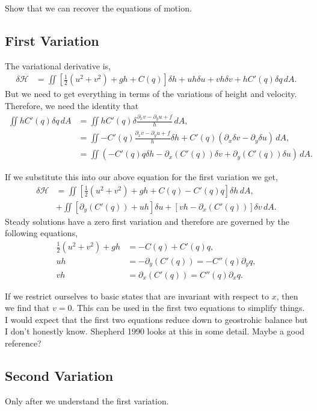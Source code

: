 \documentclass[12pt]{article}
\begin{document}
Show that we can recover the equations of motion.

\subsection{First Variation}
The variational derivative is,
\begin{align*}
\delta \mathcal{H} 
& =  \iint \left[ \frac12  (u^2 + v^2) + g h  + C(q) \right] \delta h   +  uh  \delta u + vh \delta v   + h C'(q) \delta q \, dA.
\end{align*}
But we need to get everything in terms of the variations of height and velocity.  Therefore, we need the identity that
\begin{align*}
\iint h C'(q) \delta q \, dA 
&= \iint h C'(q) \delta \frac{ \partial_x v - \partial_y u+ f}{h} \, dA, \\
&= \iint - C'(q) \frac{ \partial_x v - \partial_y u+ f}{h } \delta h + C'(q) \left(  \partial_x \delta v - \partial_y \delta u \right) \, dA, \\
&= \iint \left( - C'(q) q \delta h - \partial_x ( C'(q) )  \delta v + \partial_y ( C'(q) ) \delta u \right) \, dA.
\end{align*}

If we substitute this into our above equation for the first variation we get,
\begin{align*}
\delta \mathcal{H} 
& =  \iint \left[ \frac12  (u^2 + v^2) + g h  + C(q)  - C'(q) q\right] \delta h     \, dA, \\
& +  \iint \left[ \partial_y ( C'(q) ) + u h \right] \delta u  +  \left[ vh - \partial_x ( C'(q) )  \right] \delta v \, dA.
\end{align*}
Steady solutions have a zero first variation and therefore are governed by the following equations,
\begin{align*}
\frac12  (u^2 + v^2) + g h & = - C(q)  + C'(q) q ,\\
 u h & = - \partial_y ( C'(q) ) = - C''(q) \partial_y q, \\
vh  & = \partial_x ( C'(q) ) = C''(q) \partial_x q.
\end{align*}

If we restrict ourselves to basic states that are invariant with respect to $x$, then we find that $v= 0$.  This can be used in the first two equations to simplify things.  I would expect that the first two equations reduce down to geostrohic balance but I don't honestly know.  Shepherd 1990 looks at this in some detail.  Maybe a good reference?  

\subsection{Second Variation}
Only after we understand the first variation.
\end{document}
